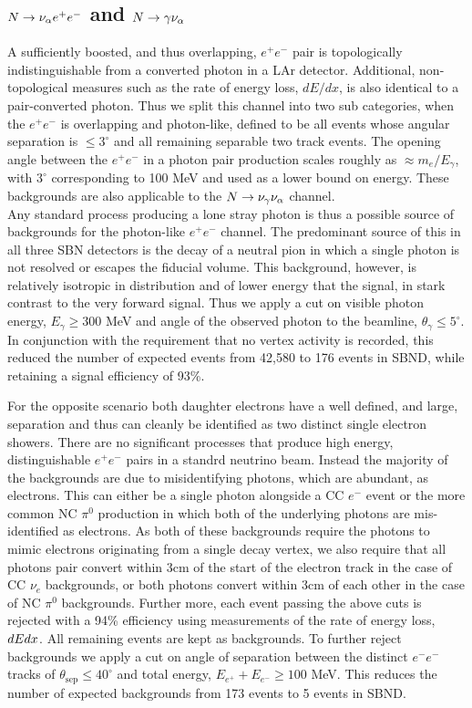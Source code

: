 \documentclass[11pt, a4paper]{article}
\def\ster{\ensuremath N}
\begin{document}
\subsection{$\ster \rightarrow \nu_\alpha e^+ e^-$ and $\ster \rightarrow \gamma \nu_\alpha$ }

A sufficiently boosted, and thus overlapping, $e^+e^-$ pair is topologically
indistinguishable from a converted photon in a LAr detector. Additional,
non-topological measures such as the rate of energy loss, $dE/dx$, is also
identical to a pair-converted photon. Thus we split this channel into two sub
categories, when the $e^+e^-$ is overlapping and photon-like, defined to be all
events whose angular separation is $\leq 3^\circ$\cite{Spitz:2011wba} and all
remaining separable two track events. The opening angle between the $e^+e^-$ in
a photon pair production scales roughly as $\approx m_e/E_\gamma$, with
$3^\circ$ corresponding to 100 MeV and used as a lower bound on energy. These
backgrounds are also applicable to the $\ster \rightarrow \nu_\gamma
\nu_\alpha$ channel.\\ 

Any standard process producing a lone stray photon is thus a possible source of
backgrounds for the photon-like $e^+e^-$ channel. The predominant source of
this in all three SBN detectors is the decay of a neutral pion in which a
single photon is not resolved or escapes the fiducial volume. This background,
however, is relatively isotropic in distribution and of lower energy that the
signal, in stark contrast to the very forward signal. Thus we apply a cut on
visible photon energy, $E_\gamma \geq 300 $ MeV and angle of the observed
photon to the beamline, $\theta_\gamma \leq 5^\circ$. In conjunction with the
requirement that no vertex activity is recorded, this reduced the number of
expected events from 42,580 to 176 events in SBND, while retaining a signal
efficiency of 93\%.

For the opposite scenario both daughter electrons have a well defined, and
large, separation and thus can cleanly be identified as two distinct single
electron showers. There are no significant processes that produce high energy,
distinguishable $e^+e^-$ pairs in a standrd neutrino beam.  Instead the
majority of the backgrounds are due to misidentifying photons, which are
abundant, as electrons. This can either be a single photon alongside a CC $e^-$
event or the more common NC $\pi^0$ production in which both of the underlying
photons are mis-identified as electrons. As both of these backgrounds require
the photons to mimic electrons originating from a single decay vertex, we also
require that all photons pair convert within 3cm of the start of the electron
track in the case of CC $\nu_e$ backgrounds, or both photons convert within 3cm
of each other in the case of NC $\pi^0$ backgrounds. Further more, each event
passing the above cuts is rejected with a 94\% efficiency using measurements of
the rate of energy loss, $dE\/dx$. All remaining events are kept as
backgrounds. To further reject backgrounds we apply a cut on angle of
separation between the distinct $e^-e^-$ tracks of $\theta_\text{sep}\leq 40
^\circ$ and total energy, $E_{e^+}+E_{e^-} \geq 100$ MeV. This reduces the
number of expected backgrounds from 173 events to 5 events in SBND. 
\end{document}
